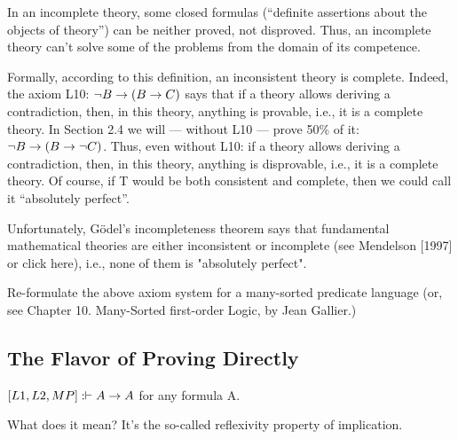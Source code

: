 In an incomplete theory, some closed formulas (``definite assertions about the objects of theory'') can be neither proved, not disproved. Thus, an incomplete theory can't solve some of the problems from the domain of its competence.

Formally, according to this definition, an inconsistent theory is complete. Indeed, the axiom L10: \(\neg B\rightarrow (B\rightarrow C)\) says that if a theory allows deriving a contradiction, then, in this theory, anything is provable, i.e., it is a complete theory. In Section 2.4 we will --- without L10 --- prove 50\% of it: \(\neg B\rightarrow (B\rightarrow \neg C)\). Thus, even without L10: if a theory allows deriving a contradiction, then, in this theory, anything is disprovable, i.e., it is a complete theory.  Of course, if T would be both consistent and complete, then we could call it ``absolutely perfect''.

Unfortunately, G\"{o}del's incompleteness theorem says that fundamental mathematical theories are
either inconsistent or incomplete (see Mendelson [1997] or click here), i.e., none of them is "absolutely
perfect".

\begin{exer}[]
Re-formulate the above axiom system for a many-sorted predicate language (or, see Chapter 10. Many-Sorted first-order Logic, by Jean Gallier.)
\end{exer}

\subsection{The Flavor of Proving Directly}

\begin{thm}[]
\([L1, L2, MP]: \vdash A\rightarrow A\) for any formula A.
\end{thm}
What does it mean? It's the so-called reflexivity property of implication.


